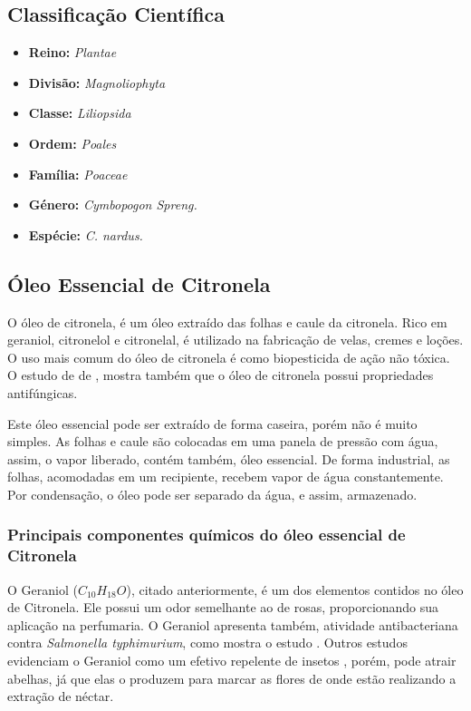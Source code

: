\documentclass[
	article,			%
	11pt,				%
	oneside,			%
	a4paper,			%
	english,			%
	brazil,				%
	]{abntex2}
\begin{document}
\subsection{Classificação Científica}

\begin{itemize}

	\item \textbf{Reino:}	\emph{Plantae}

	\item \textbf{Divisão:} \emph{Magnoliophyta}

	\item \textbf{Classe:}	\emph{Liliopsida}

	\item \textbf{Ordem:}	\emph{Poales}

	\item \textbf{Família:}	 \emph{Poaceae}

	\item \textbf{Género:}	\emph{Cymbopogon Spreng.}

	\item \textbf{Espécie:}	 \emph{C. nardus.}

\end{itemize}

\subsection{Óleo Essencial de Citronela}
O óleo de citronela, é um óleo extraído das folhas e caule da citronela. Rico em geraniol, citronelol e citronelal, é utilizado na fabricação de velas, cremes e loções. O uso mais comum do óleo de citronela é como biopesticida de ação não tóxica. O estudo de \citeauthor{pattnaik95} de \citeyear{pattnaik95}, mostra também que o óleo de citronela possui propriedades antifúngicas.

Este óleo essencial pode ser extraído de forma caseira, porém não é muito simples. As folhas e caule são colocadas em uma panela de pressão com água, assim, o vapor liberado, contém também, óleo essencial. De forma industrial, as folhas, acomodadas em um recipiente, recebem vapor de água constantemente. Por condensação, o óleo pode ser separado da água, e assim, armazenado.

\subsubsection{Principais componentes químicos do óleo essencial de Citronela}
O Geraniol ($C_{10}H_{18}O$), citado anteriormente, é um dos elementos contidos no óleo de Citronela. Ele possui um odor semelhante ao de rosas, proporcionando sua aplicação na perfumaria. O Geraniol apresenta também, atividade antibacteriana contra \emph{Salmonella typhimurium}, como mostra o estudo \cite{kim1995}. Outros estudos evidenciam o Geraniol como um efetivo repelente de insetos \cite{barnard2004}, porém, pode atrair abelhas, já que elas o produzem para marcar as flores de onde estão realizando a extração de néctar.
\end{document}
